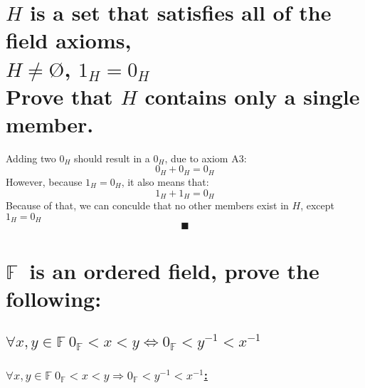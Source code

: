 \documentclass[a4paper, 12pt]{article}
\newcommand{\sub}[1]{\subsection{\underline{#1}}}
\newcommand{\subsub}[1]{\subsubsection{\underline{#1}}}
\newcommand{\?}{\stackrel{?}{=}}
\newcommand{\F}{\ensuremath{\mathbb{F}}}
\renewcommand{\qed}{$$\blacksquare$$}
\begin{document}
\section{$H$ is a set that satisfies all of the field axioms,\\
$H \neq \text{\O}$, $1_H=0_H$\\
Prove that $H$ contains only a single member.}
Adding two $0_H$ should result in a $0_H$, due to axiom A3: $$ 0_H + 0_H = 0_H $$
However, because $1_H=0_H$, it also means that: $$ 1_H + 1_H = 0_H $$
Because of that, we can conculde that no other members exist in $H$, except $1_H=0_H$
\qed

\section{\F~is an ordered field, prove the following:}

\sub{$\forall{x,y} \in{\F}~ 0_{\F}<x<y \iff 0_{\F}<y^{-1}<x^{-1} $}
\subsub{$\forall{x,y} \in{\F}~ 0_{\F}<x<y \Longrightarrow 0_{\F}<y^{-1}<x^{-1} $:}


\end{document}
